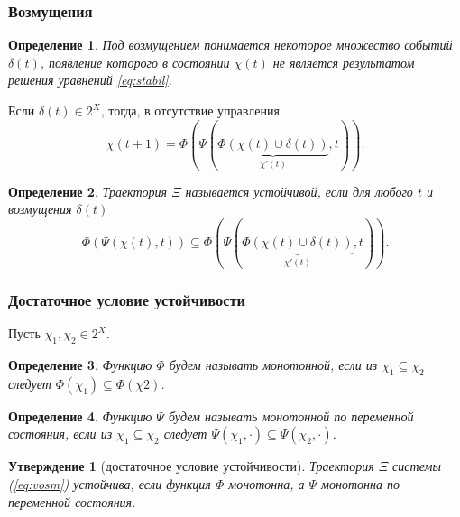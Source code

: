 \documentclass[default]{beamer}
\newtheorem{Pred}{Утверждение}
\newtheorem{Def}{Определение}
\begin{document}
	\begin{frame}
		\frametitle{Возмущения}
		
		\begin{Def}
			Под возмущением понимается некоторое множество событий $\delta(t)$, появление которого в состоянии $\chi(t)$ не является результатом решения уравнений \ref{eq:stabil}.
		\end{Def}
		Если $\delta(t)\in 2^X $, тогда, в отсутствие управления
		\begin{equation}
			\chi(t+1) =\Phi(\Psi(\underbrace{\Phi(\chi(t)\cup\delta(t))}_{\chi'(t)},t)).
		\end{equation}
		\begin{Def}
			Траектория $\Xi$ называется устойчивой, если для любого $t$ и возмущения $\delta(t)$ 
			\begin{equation}
				\Phi(\Psi(\chi(t),t))\subseteq\Phi(\Psi(\underbrace{\Phi(\chi(t)\cup\delta(t))}_{\chi'(t)},t)).
			\end{equation}
		\end{Def}
		
	\end{frame}

	\begin{frame}
		\frametitle{Достаточное условие устойчивости}
		
		Пусть $\chi_1,\chi_2\in 2^X$.
		\begin{Def}
			Функцию $\Phi$ будем называть монотонной, если из $\chi_1\subseteq\chi_2$ следует $\Phi(\chi_1)\subseteq\Phi(\chi2)$.
		\end{Def}
		
		\begin{Def}
			Функцию $\Psi$ будем называть монотонной по переменной состояния, если из $\chi_1\subseteq\chi_2$ следует $\Psi(\chi_1,\cdot)\subseteq\Psi(\chi_2,\cdot)$.
		\end{Def}
		
		\begin{Pred}[достаточное условие устойчивости]
			Траектория $\Xi$ системы (\ref{eq:vosm}) устойчива, если функция $\Phi$ монотонна, а $\Psi$ монотонна по переменной состояния.
			
		\end{Pred}		
	\end{frame}
\end{document}
